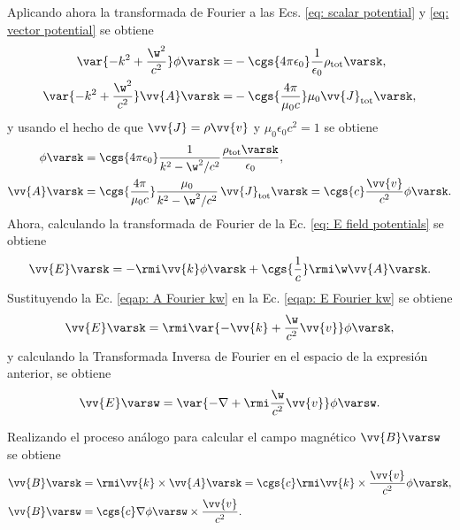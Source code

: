 Aplicando ahora la transformada de Fourier a las Ecs. \eqref{eq: scalar potential} y \eqref{eq: vector potential} se obtiene 
\begin{align}
\var{-k^2+\frac{\w^2}{c^2}}\phi\varsk =& -\cgs{4\pi\epsilon_0}\frac{1}{\epsilon_0}\rho_{\text{tot}}\varsk, \\
\var{-k^2+\frac{\w^2}{c^2}}\vv{A}\varsk =& - \cgs{\frac{4\pi}{\mu_0 c}}\mu_0\vv{J}_{\text{tot}}\varsk, 
\end{align}
y usando el hecho de que $\vv{J} = \rho \vv{v}$ y $\mu_0 \epsilon_0 c^2 = 1$ se obtiene
\begin{align}
\phi\varsk &= \cgs{4\pi\epsilon_0}\frac{1}{k^2-\w^2/c^2} \frac{\rho_{\rm tot}\varsk}{\epsilon_0}, \label{eqap: phi Fourier kw} \\
\vv{A}\varsk &= \cgs{\frac{4\pi}{\mu_0 c}}\frac{\mu_0}{k^2-\w^2/c^2}\,\vv{J}_{\text{tot}}\varsk = \cgs{c}\frac{\vv{v}}{c^2}\phi\varsk. \label{eqap: A Fourier kw}
\end{align}
Ahora, calculando la transformada de Fourier de la Ec. \eqref{eq: E field potentials} se obtiene 
\begin{equation}
\vv{E}\varsk = - \rmi \vv{k} \phi\varsk + \cgs{\frac{1}{c}}\rmi \w \vv{A}\varsk \label{eqap: E Fourier kw}.
\end{equation}
Sustituyendo la Ec. \eqref{eqap: A Fourier kw} en la Ec. \eqref{eqap: E Fourier kw} se obtiene
\begin{equation}
\vv{E}\varsk = \rmi \var{-\vv{k}+\frac{\w}{c^2}\vv{v}}\phi\varsk, 
\end{equation}
y calculando la Transformada Inversa de Fourier en el espacio de la expresión anterior, se obtiene
\begin{equation}
\vv{E}\varsw = \var{-\nabla+\rmi \frac{\w}{c^2}\vv{v}}\phi\varsw.
\end{equation}

Realizando el proceso análogo para calcular el campo magnético $\vv{B}\varsw$ se obtiene
\begin{align}
\vv{B}\varsk &= \rmi \vv{k}\times\vv{A}\varsk = \cgs{c}\rmi \vv{k}\times\frac{\vv{v}}{c^2}\phi\varsk,\\
\vv{B}\varsw &= \cgs{c}\nabla \phi\varsw\times\frac{\vv{v}}{c^2}.
\end{align}

